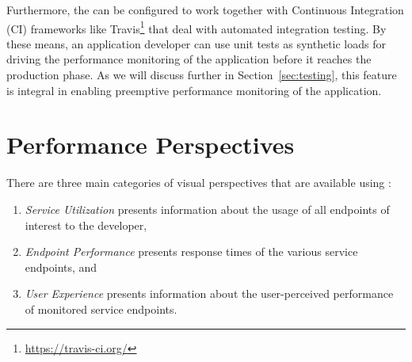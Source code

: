 \documentclass{sig-alternate-05-2015}
\begin{document}
  Furthermore, the \tool can be configured to work together with Continuous Integration (CI) frameworks like Travis\footnote{\url{https://travis-ci.org/}} that deal with automated integration testing. By these means, an application developer can use unit tests as synthetic loads for driving the performance monitoring of the application before it reaches the production phase.  As we will discuss further in Section~\ref{sec:testing}, this feature is integral in enabling preemptive performance monitoring of the application.  

\section{Performance Perspectives}
\label{sec:views}

  There are three main categories of visual perspectives that are available using \tool:
  \begin{enumerate}
    \item \textit{Service Utilization} presents information about the usage of all endpoints of interest to the developer,
    \item \textit{Endpoint Performance} presents response times of the various service endpoints, and
    \item \textit{User Experience} presents information about the user-perceived performance of monitored service endpoints.
  \end{enumerate}


\end{document}
